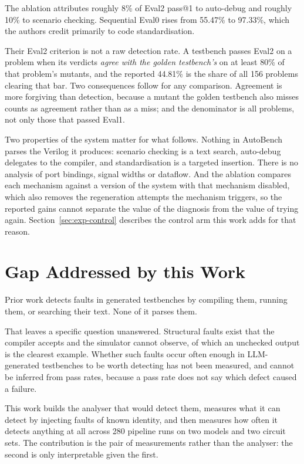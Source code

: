 \documentclass[11pt,a4paper,titlepage=false]{scrreprt}
\begin{document}
The ablation attributes roughly 8\% of Eval2 pass@1 to auto-debug and roughly 10\% to
scenario checking. Sequential Eval0 rises from 55.47\% to 97.33\%, which the authors credit
primarily to code standardisation.

Their Eval2 criterion is not a raw detection rate. A testbench passes Eval2 on a problem when
its verdicts \emph{agree with the golden testbench's} on at least 80\% of that problem's
mutants, and the reported 44.81\% is the share of all 156 problems clearing that bar. Two
consequences follow for any comparison. Agreement is more forgiving than detection, because a
mutant the golden testbench also misses counts as agreement rather than as a miss; and the
denominator is all problems, not only those that passed Eval1.

Two properties of the system matter for what follows. Nothing in AutoBench parses the
Verilog it produces: scenario checking is a text search, auto-debug delegates to the
compiler, and standardisation is a targeted insertion. There is no analysis of port
bindings, signal widths or dataflow. And the ablation compares each mechanism against a
version of the system with that mechanism disabled, which also removes the regeneration
attempts the mechanism triggers, so the reported gains cannot separate the value of the
diagnosis from the value of trying again. Section~\ref{sec:exp-control} describes the
control arm this work adds for that reason.

\section{Gap Addressed by this Work}\label{sec:bg-gap}

Prior work detects faults in generated testbenches by compiling them, running them, or
searching their text. None of it parses them.

That leaves a specific question unanswered. Structural faults exist that the compiler
accepts and the simulator cannot observe, of which an unchecked output is the clearest
example. Whether such faults occur often enough in LLM-generated testbenches to be worth
detecting has not been measured, and cannot be inferred from pass rates, because a pass rate
does not say which defect caused a failure.

This work builds the analyser that would detect them, measures what it can detect by
injecting faults of known identity, and then measures how often it detects anything at all
across 280 pipeline runs on two models and two circuit sets. The contribution is the pair of
measurements rather than the analyser: the second is only interpretable given the first.
\end{document}
